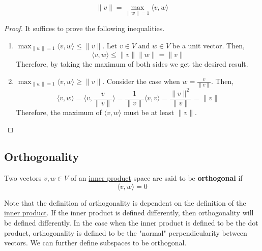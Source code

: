 	\begin{theorem}
	  \label{thm:variational-definition-of-norm}
    \begin{equation}
      \|v\| = \max_{\|w\|=1} \langle v, w \rangle
    \end{equation}
  \end{theorem} 
	\begin{proof}
	  It suffices to prove the following inequalities. 
		\begin{enumerate}
			\item $\max_{\|w\| = 1} \langle v, w \rangle \leq \|v\|$. Let $v \in V$ and $w \in V$ be a unit vector. Then, 
				\begin{equation}
				  \langle v, w \rangle \leq \|v\| \|w\| = \|v\|
				\end{equation}
				Therefore, by taking the maximum of both sides we get the desired result. 
			\item $\max_{\|w\| = 1} \langle v, w \rangle \geq \|v\|$. Consider the case when $w = \frac{v}{\|v\|}$. Then, 
				\begin{equation}
					\langle v, w \rangle = \langle v, \frac{v}{\|v\|} \rangle = \frac{1}{\|v\|} \langle v, v \rangle = \frac{\|v\|^2}{\|v\|} = \|v\|
				\end{equation}
				Therefore, the maximum of $\langle v, w \rangle$ must be at least $\|v\|$. 
		\end{enumerate}
	\end{proof}

\subsection{Orthogonality}

  \begin{definition}
    \label{def:orthogonal-vectors}
    Two vectors $v, w \in V$ of an \hyperref[def:inner-product]{inner product} space are said to be \textbf{orthogonal} if 
    \begin{equation}
      \langle v, w \rangle = 0
    \end{equation}
  \end{definition}

  Note that the definition of orthogonality is dependent on the definition of the \hyperref[def:inner-product]{inner product}. If the inner product is defined differently, then orthogonality will be defined differently. In the case when the inner product is defined to be the dot product, orthogonality is defined to be the "normal" perpendicularity between vectors. We can further define subspaces to be orthogonal. 

